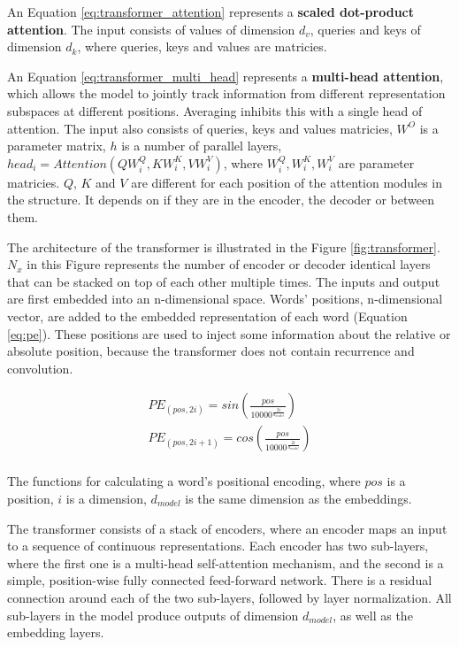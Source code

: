 An Equation \ref{eq:transformer_attention} represents a \textbf{scaled dot-product attention}. The input consists of values of dimension $d_v$, queries and keys of dimension $d_k$, where queries, keys and values are matricies.

An Equation \ref{eq:transformer_multi_head} represents a \textbf{multi-head attention}, which allows the model to jointly track information from different representation subspaces at different positions. Averaging inhibits this with a single head of attention. The input also consists of queries, keys and values matricies, $W^O$ is a parameter matrix, $h$ is a number of parallel layers, $head_i = Attention(QW_i^Q, KW_i^K, VW_i^V)$, where $W_i^Q, W_i^K, W_i^V$ are parameter matricies. $Q$, $K$ and $V$ are different for each position of the attention modules in the structure. It depends on if they are in the encoder, the decoder or between them.

The architecture of the transformer is illustrated in the Figure \ref{fig:transformer}. $N_x$ in this Figure represents the number of encoder or decoder identical layers that can be stacked on top of each other multiple times. The inputs and output are first embedded into an n-dimensional space. Words' positions, n-dimensional vector, are added to the embedded representation of each word (Equation \ref{eq:pe}). These positions are used to inject some information about the relative or absolute position, because the transformer does not contain recurrence and convolution. 

\begin{eqfloat} [H]
\begin{equation} \label{eq:pe}
\begin{array}{lcl} 
PE_{(pos, 2i)} = sin(\frac{pos}{10000^{\frac{2i}{d_{model}}}}) \\

PE_{(pos, 2i+1)} = cos(\frac{pos}{10000^{\frac{2i}{d_{model}}}})\\
\end{array}
\end{equation}
\caption{The functions for calculating a word's positional encoding, where $pos$ is a position, $i$ is a dimension, $d_{model}$ is the same dimension as the embeddings.}
\end{eqfloat}

The transformer consists of a stack of encoders, where an encoder maps an input to a sequence of continuous representations. Each encoder has two sub-layers, where the first one is a multi-head self-attention mechanism, and the second is a simple, position-wise fully connected feed-forward network. There is a residual connection \cite{he2016deep} around each of the two sub-layers, followed by layer normalization. All sub-layers in the model produce outputs of dimension $d_{model}$, as well as the embedding layers.

